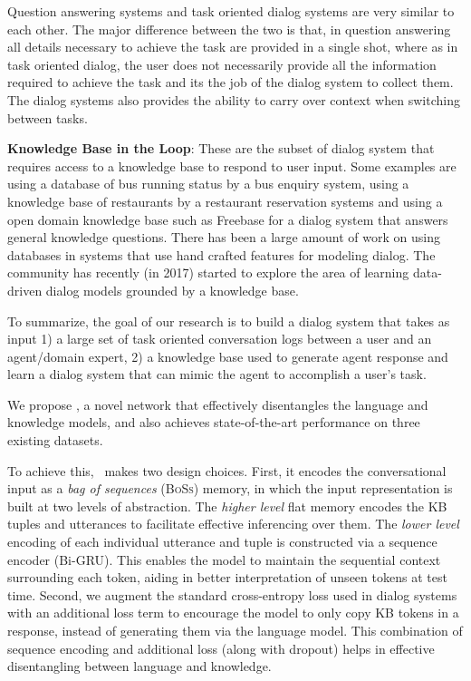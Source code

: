 Question answering systems and task oriented dialog systems are very similar to each other. The major difference between the two is that, in question answering all details necessary to achieve the task are provided in a single shot, where as in task oriented dialog, the user does not necessarily provide all the information required to achieve the task and its the job of the dialog system to collect them. The dialog systems also provides the ability to carry over context when switching between tasks.

\textbf{Knowledge Base in the Loop}: These are the subset of dialog system that requires access to a knowledge base to respond to user input. Some examples are  using a database of bus running status by a bus enquiry system, using a knowledge base of restaurants by a restaurant reservation systems and using a open domain knowledge base such as Freebase for a dialog system that answers general knowledge questions. There has been a large amount of work on using databases in systems that use hand crafted features for modeling dialog. The community has recently (in 2017) started to explore the area of learning data-driven dialog models grounded by a knowledge base.

To summarize, the goal of our research is to build a dialog system that takes as input 1) a large set of task oriented conversation logs between a user and an agent/domain expert, 2) a knowledge base used to generate agent response and learn a dialog system that can mimic the agent to accomplish a user's task.  

We propose \sys, a novel network that effectively disentangles the language and knowledge models, and also achieves state-of-the-art performance on three existing datasets.  

To achieve this, \sys\ makes two design choices. First, it encodes the conversational input as a {\em bag of sequences} (\textsc{BoSs}) memory, in which the input representation is built at two levels of abstraction. The \emph{higher level} flat memory encodes the KB tuples and utterances to facilitate effective inferencing over them. The \emph{lower level} encoding of each individual utterance and tuple is constructed via a sequence encoder (Bi-GRU). This enables the model to maintain the sequential context surrounding each token, aiding in better interpretation of unseen tokens at test time. Second, we augment the standard cross-entropy loss used in dialog systems with an additional loss term to encourage the model to only copy KB tokens in a response, instead of generating them via the language model. This combination of sequence encoding and additional loss (along with dropout) helps in effective disentangling between language and knowledge.  

